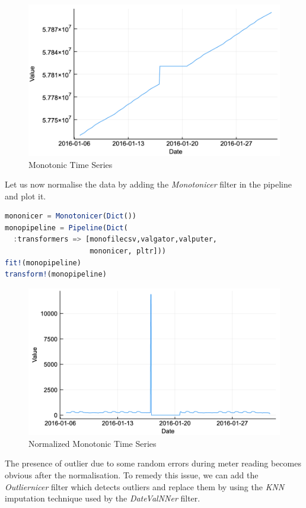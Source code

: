 \documentclass{juliacon}
\begin{document}
\begin{figure}[htbp]
   \centering
   \includegraphics[width=0.9\columnwidth]{mono.png} %
   \caption{Monotonic Time Series}
   \label{fig:mono}
\end{figure}

Let us now normalise the data by adding the \emph{Monotonicer} filter in the pipeline and plot it.
\begin{lstlisting}[language = Julia]
mononicer = Monotonicer(Dict())
monopipeline = Pipeline(Dict(
  :transformers => [monofilecsv,valgator,valputer,
                    mononicer, pltr]))
fit!(monopipeline) 
transform!(monopipeline)
\end{lstlisting}

\begin{figure}[htbp]
   \centering
   \includegraphics[width=\columnwidth]{mononicer.png} %
   \caption{Normalized Monotonic Time Series}
   \label{fig:nmono}
\end{figure}

The presence of outlier due to some random errors during meter reading  becomes obvious after the normalisation. To remedy this issue, we can add the \emph{Outliernicer} filter which detects outliers and replace them by using the \emph{KNN} imputation technique used by the \emph{DateValNNer} filter.
\end{document}
